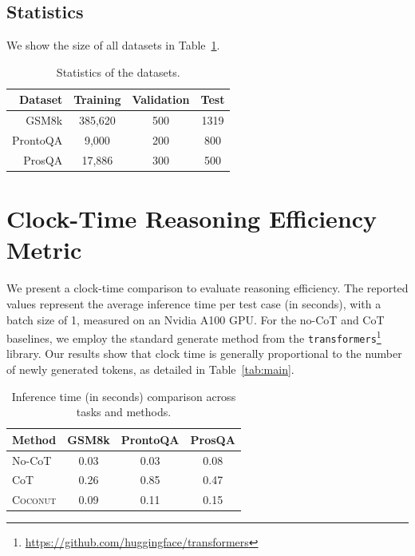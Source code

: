 \documentclass[]{fairmeta}
\newcommand{\ours}{\textsc{Coconut}\xspace}
\begin{document}
\subsection{Statistics}

We show the size of all datasets in Table~\ref{tab:stats}.

\begin{table}[]

    \centering
    \begin{tabular}{r|c|c|c}
    \toprule
         Dataset & Training & Validation & Test \\
         \midrule
           GSM8k & 385,620 & 500 & 1319 \\
           ProntoQA & 9,000 & 200 & 800 \\
           ProsQA & 17,886 & 300 & 500 \\
          \bottomrule
    \end{tabular}
    \captionsetup{justification=centering}
    \caption{Statistics of the datasets.}
    \label{tab:stats}
\end{table}


\section{Clock-Time Reasoning Efficiency Metric} \label{sec:clock}

We present a clock-time comparison to evaluate reasoning efficiency. The reported values represent the average inference time per test case (in seconds), with a batch size of 1, measured on an Nvidia A100 GPU. For the no-CoT and CoT baselines, we employ the standard generate method from the \texttt{transformers}\footnote{\url{https://github.com/huggingface/transformers}} library. Our results show that clock time is generally proportional to the number of newly generated tokens, as detailed in Table~\ref{tab:main}.



\begin{table}[h!]
    \centering
    \label{tab:efficiency}
    \begin{tabular}{lccc}
        \toprule
        Method & GSM8k & ProntoQA & ProsQA \\
        \midrule
        No-CoT & 0.03 & 0.03 & 0.08 \\
        CoT    & 0.26 & 0.85 & 0.47 \\
        \ours   & 0.09 & 0.11 & 0.15 \\
        \bottomrule
        
    \end{tabular}
    
    \captionsetup{justification=centering}
    \caption{Inference time (in seconds) comparison across tasks and methods.}
\end{table}
\end{document}
